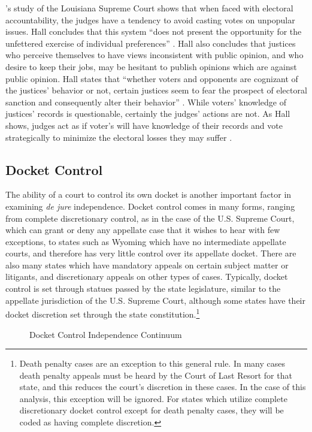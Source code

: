 \documentclass[12pt]{article}
\begin{document}
\citet{Hall1987a}'s study of the Louisiana Supreme Court shows that when faced with electoral accountability, the judges have a tendency to avoid casting votes on unpopular issues. Hall concludes that this system ``does not present the opportunity for the unfettered exercise of individual preferences'' \citep[46]{Hall1987a}.  Hall also concludes that justices who perceive themselves to have views inconsistent with public opinion,  and who desire to keep their jobs, may be hesitant to publish opinions which are against public opinion. Hall states that ``whether voters and opponents are cognizant of the justices’ behavior or not, certain justices seem to fear the prospect of electoral sanction and consequently alter their behavior'' \citep[1123]{Hall1987b}.  While voters’ knowledge of justices' records is questionable, certainly the judges' actions are not.  As Hall shows, judges act as if voter's will have knowledge of their records and vote strategically to minimize the electoral losses they may suffer \citep{Hall1987b}.

\subsection*{Docket Control}
The ability of a court to control its own docket is another important factor in examining \textit{de jure} independence.  Docket control comes in many forms, ranging from complete discretionary control, as in the case of the U.S. Supreme Court, which can grant or deny any appellate case that it wishes to hear with few exceptions, to states such as Wyoming which have no intermediate appellate courts, and therefore has very little control over its appellate docket. There are also many states which have mandatory appeals on certain subject matter or litigants, and discretionary appeals on other types of cases.  Typically, docket control is set through statues passed by the state legislature, similar to the appellate jurisdiction of the U.S. Supreme Court, although some states have their docket discretion set through the state constitution.\footnote{Death penalty cases are an exception to this general rule.  In many cases death penalty appeals must be heard by the Court of Last Resort for that state, and this reduces the court's discretion in these cases.  In the case of this analysis, this exception will be ignored.  For states which utilize complete discretionary docket control except for death penalty cases, they will be coded as having complete discretion.}

\begin{figure}[tbh]\centering\caption{Docket Control Independence Continuum}\label{docketcontinuum}
\end{figure}
\end{document}
